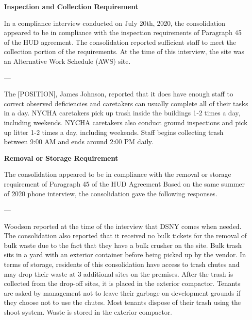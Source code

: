 

\textbf{Inspection and Collection Requirement}

In a compliance interview conducted on July 20th, 2020, the consolidation appeared to be in compliance with the inspection requirements of Paragraph 45 of the HUD agreement. The consolidation reported sufficient staff to meet the collection portion of the requirements. At the time of this interview, the site was an Alternative Work Schedule (AWS) site. 

---

The [POSITION], James Johnson, reported that it does have enough staff to correct observed deficiencies and caretakers can usually complete all of their tasks in a day. NYCHA caretakers pick up trash inside the buildings 1-2 times a day, including weekends. NYCHA caretakers also conduct ground inspections and pick up litter 1-2 times a day, including weekends. Staff begins collecting trash between 9:00 AM and ends around 2:00 PM daily. 

\textbf{Removal or Storage Requirement}

The consolidation appeared to be in compliance with the  removal or storage requirement of Paragraph  45 of the HUD Agreement Based on the same summer of  2020 phone interview, the consolidation gave the following responses.

---

Woodson reported at the time of the interview that DSNY comes when needed. The consolidation also reported that it received no bulk tickets for the removal of bulk waste due to the fact that they have a bulk crusher on the site. Bulk trash sits in a yard with an exterior container before being picked up by the vendor. In terms of storage, residents of this consolidation have access to trash chutes and may drop their waste at 3 additional sites on the premises. After the trash is collected from the drop-off sites, it is placed in the exterior compactor. Tenants are asked by management not to leave their garbage on development grounds if they choose not to use the chutes. Most tenants dispose of their trash using the shoot system. Waste is stored in the exterior compactor. 